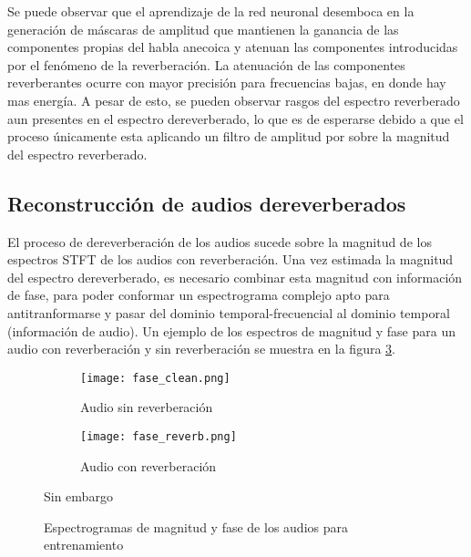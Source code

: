 Se puede observar que el aprendizaje de la red neuronal desemboca en la generación de máscaras de amplitud que mantienen la ganancia de las componentes propias del habla anecoica y atenuan las componentes introducidas por el fenómeno de la reverberación. La atenuación de las componentes reverberantes ocurre con mayor precisión para frecuencias bajas, en donde hay mas energía. A pesar de esto, se pueden observar rasgos del espectro reverberado aun presentes en el espectro dereverberado, lo que es de esperarse debido a que el proceso únicamente esta aplicando un filtro de amplitud por sobre la magnitud del espectro reverberado.



\subsection{Reconstrucción de audios dereverberados}
El proceso de dereverberación de los audios sucede sobre la magnitud de los espectros STFT de los audios con reverberación. Una vez estimada la magnitud del espectro dereverberado, es necesario combinar esta magnitud con información de fase, para poder conformar un espectrograma complejo apto para antitranformarse y pasar del dominio temporal-frecuencial al dominio temporal (información de audio). Un ejemplo de los espectros de magnitud y fase para un audio con reverberación y sin reverberación se muestra en la figura \ref{fig:fases}.

\begin{figure}[H]
\centering
\begin{subfigure}{.5\textwidth}
  \centering
  \texttt{[image: fase\_clean.png]}
  \caption{Audio sin reverberación}
  \label{fig:fase_sub1}
\end{subfigure}%
\begin{subfigure}{.5\textwidth}
  \centering
  \texttt{[image: fase\_reverb.png]}
  \caption{Audio con reverberación}
  \label{fig:fase_sub2}
\end{subfigure}Sin embargo
\caption{Espectrogramas de magnitud y fase de los audios para entrenamiento}
\label{fig:fases}
\end{figure} 

